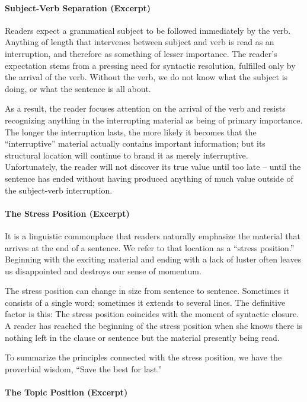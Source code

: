 \paragraph{Subject-Verb Separation (Excerpt)}

  Readers expect a grammatical subject to be followed immediately by the verb. Anything of length that intervenes between subject and verb is read as an interruption, and therefore as something of lesser importance.
The reader’s expectation stems from a pressing need for syntactic resolution, fulfilled only by the arrival of the verb. Without the verb, we do not know what the subject is doing, or what the sentence is all about.

As a result, the reader focuses attention on the arrival of the verb and resists recognizing anything in the interrupting material as being of primary importance.
The longer the interruption lasts, the more likely it becomes that the “interruptive” material actually contains important information; but its structural location will continue to brand it as merely interruptive.
Unfortunately, the reader will not discover its true value until too late – until the sentence has ended without having produced anything of much value outside of the subject-verb interruption.

\paragraph{The Stress Position (Excerpt)}

It is a linguistic commonplace that readers naturally emphasize the material that arrives at the end of a sentence. We refer to that location as a “stress position.”
Beginning with the exciting material and ending with a lack of luster often leaves us disappointed and destroys our sense of momentum.

The stress position can change in size from sentence to sentence. Sometimes it consists of a single word; sometimes it extends to several lines. The definitive factor is this: The stress position coincides with the moment of syntactic closure. A reader has reached the beginning of the stress position when she knows there is nothing left in the clause or sentence but the material presently being read.

To summarize the principles connected with the stress position, we have the proverbial wisdom, “Save the best for last.”

\paragraph{The Topic Position (Excerpt)}

